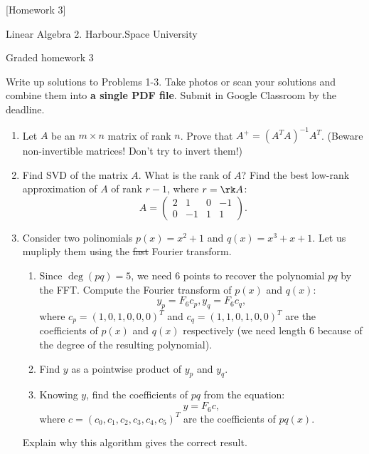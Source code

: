 [Homework 3]

\begin{center}
Linear Algebra 2. Harbour.Space University

Graded homework 3
\end{center}

Write up solutions to Problems 1-3. Take photos or scan your solutions and combine them into {\bf a single PDF file}. Submit in Google Classroom by the deadline.

\begin{enumerate}[1. ]

\item Let $A$ be an $m \times n$ matrix of rank $n$. Prove that $A^{+}=\left(A^T A\right)^{-1} A^T$. (Beware non-invertible matrices! Don't try to invert them!)

\item Find SVD of the matrix $A$. What is the rank of $A$? Find the best low-rank approximation of $A$ of rank $r-1$, where $r = \rk A$:
$$
A = \begin{pmatrix}
    2 & 1 & 0 & -1 \\
    0 & -1 & 1 & 1
    \end{pmatrix}.
$$

\item Consider two polinomials $p(x) = x^2 + 1$ and $q(x) = x^3 + x + 1$. Let us mupliply them using the \st{fast} Fourier transform. 

\begin{enumerate}[1) ]
\item Since $\deg (pq) = 5$, we need 6 points to recover the polynomial $pq$ by the FFT. Compute the Fourier transform of $p(x)$ and $q(x)$:
$$
y_p = F_6 c_p, y_q = F_6 c_q,
$$
where $c_p = (1, 0, 1, 0, 0, 0)^T$ and $c_q = (1, 1, 0, 1, 0, 0)^T$ are the coefficients of $p(x)$ and $q(x)$ respectively (we need length 6 because of the degree of the resulting polynomial).

\item Find $y$ as a pointwise product of $y_p$ and $y_q$.

\item Knowing $y$, find the coefficients of $pq$ from the equation:
$$
y = F_6 c,
$$
where $c = (c_0, c_1, c_2, c_3, c_4, c_5)^T$ are the coefficients of $pq(x)$.
\end{enumerate}

Explain why this algorithm gives the correct result.

\end{enumerate}